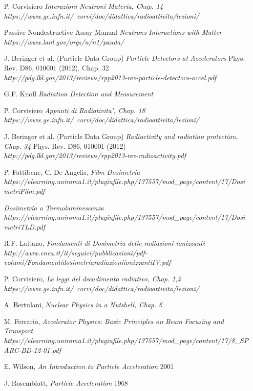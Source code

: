 \documentclass [a4paper, twoside] {book}
\begin{document}
\begin{thebibliography}{35}
P. Corvisiero
\textit{Interazioni Neutroni Materia, Chap. 14}
\\ \textit{https://www.ge.infn.it/~corvi/doc/didattica/radioattivita/lezioni/}

Passive Nondestructive Assay Manual
\textit{Neutrons Interactions with Matter}
\\ \textit{https://www.lanl.gov/orgs/n/n1/panda/}

J. Beringer et al. (Particle Data Group)
\textit{Particle Detectors at Accelerators}
Phys. Rev. D86, 010001 (2012), Chap. 32
\\ \textit{http://pdg.lbl.gov/2013/reviews/rpp2013-rev-particle-detectors-accel.pdf}

G.F. Knoll
\textit{Radiation Detection and Measurement}

P. Corvisiero
\textit{Appunti di Radiativita', Chap. 18}
\\ \textit{https://www.ge.infn.it/~corvi/doc/didattica/radioattivita/lezioni/}

J. Beringer et al. (Particle Data Group)
\textit{Radiactivity and radiation protection, Chap. 34}
Phys. Rev. D86, 010001 (2012)
\\ \textit{http://pdg.lbl.gov/2013/reviews/rpp2013-rev-radioactivity.pdf}

P. Fattibene, C. De Angelis,
\textit{Film Dosimetria}
\\ \textit{https://elearning.uniroma1.it/pluginfile.php/137557/mod\_page/content/17/DosimetriFilm.pdf}

\textit{Dosimetria a Termoluminescenza}
\\ \textit{https://elearning.uniroma1.it/pluginfile.php/137557/mod\_page/content/17/DosimetriTLD.pdf}

R.F. Laitano,
\textit{Fondamenti di Dosimetria delle radiazioni ionizzanti}
\\ \textit{http://www.enea.it/it/seguici/pubblicazioni/pdf-volumi/FondamentidosimetriaradiazioniionizzantiIV.pdf}

P. Corvisiero,
\textit{Le leggi del decadimento radiativo, Chap. 1,2}
\\ \textit{https://www.ge.infn.it/~corvi/doc/didattica/radioattivita/lezioni/}

A. Bertulani,
\textit{Nuclear Physics in a Nutshell, Chap. 6}

M. Ferrario,
\textit{Accelerator Physics: Basic Principles on Beam Focusing and Transport}
\\ \textit{https://elearning.uniroma1.it/pluginfile.php/137557/mod\_page/content/17/8\_SPARC-BD-12-01.pdf}

E. Wilson,
\textit{An Introduction to Particle Acceleration}
2001

J. Rosemblatt,
\textit{Particle Acceleration}
1968




\end{thebibliography}
\end{document}
